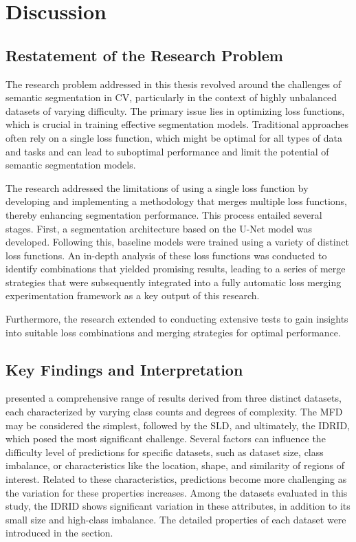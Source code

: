 \chapter{Discussion}
\label{chap:discussion}
\section{Restatement of the Research Problem}
The research problem addressed in this thesis revolved around the challenges of semantic segmentation in \ac{CV}, particularly in the context of highly unbalanced datasets of varying difficulty. The primary issue lies in optimizing loss functions, which is crucial in training effective segmentation models. Traditional approaches often rely on a single loss function, which might be optimal for all types of data and tasks and can lead to suboptimal performance and limit the potential of semantic segmentation models.

The research addressed the limitations of using a single loss function by developing and implementing a methodology that merges multiple loss functions, thereby enhancing segmentation performance. This process entailed several stages. First, a segmentation architecture based on the U-Net model was developed. Following this, baseline models were trained using a variety of distinct loss functions. An in-depth analysis of these loss functions was conducted to identify combinations that yielded promising results, leading to a series of merge strategies that were subsequently integrated into a fully automatic loss merging experimentation framework as a key output of this research.

Furthermore, the research extended to conducting extensive tests to gain insights into suitable loss combinations and merging strategies for optimal performance. 

\section{Key Findings and Interpretation}
 presented a comprehensive range of results derived from three distinct datasets, each characterized by varying class counts and degrees of complexity. The \acf{MFD} may be considered the simplest, followed by the \acf{SLD}, and ultimately, the \acf{IDRID}, which posed the most significant challenge. Several factors can influence the difficulty level of predictions for specific datasets, such as dataset size, class imbalance, or characteristics like the location, shape, and similarity of regions of interest. Related to these characteristics, predictions become more challenging as the variation for these properties increases. Among the datasets evaluated in this study, the \ac{IDRID} shows significant variation in these attributes, in addition to its small size and high-class imbalance. The detailed properties of each dataset were introduced in the  section.

